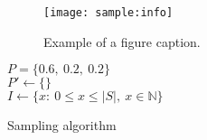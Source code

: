 \documentclass[conference]{IEEEtran}
\begin{document}
\begin{figure}[h]
    \texttt{[image: sample:info]}
    \caption{Example of a figure caption. \label{fig:sample:info}}
\end{figure}

\begin{algorithm}
    $P = \{0.6,\ 0.2,\ 0.2\}$\\
    $P' \gets \{\}$\\
    $I \gets \{x:\ 0\leq x\leq \lvert S\rvert,\ x\in\mathbb{N}\}$\\
    \caption{Sampling algorithm}\label{sampling:alg}
\end{algorithm}


\end{document}
